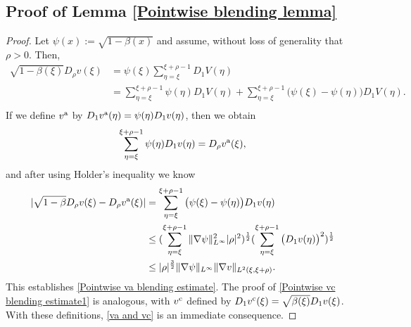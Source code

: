 \subsection{Proof of Lemma \ref{Pointwise blending lemma}}\label{Appendix section 3}
\begin{proof}
	Let $\psi(x):=\sqrt{1-\beta(x)}$ and assume, without loss of generality that $\rho>0$. Then,
	\begin{align*}
		\sqrt{1-\beta(\xi)} D_{\rho}v(\xi)&= \psi (\xi) \sum_{\eta = \xi}^{\xi+\rho-1}D_{1}V(\eta)\\
		&=\sum_{\eta = \xi}^{\xi+\rho-1}\psi(\eta)D_{1}V(\eta) + \sum_{\eta = \xi}^{\xi+\rho-1} \big(\psi(\xi)-\psi(\eta)\big)D_{1}V(\eta).\\
	\end{align*}
	If we define $v^{\text{a}}$ by $D_{1}v^{\text{a}}(\eta)=\psi(\eta)D_{1}v(\eta)$, then we obtain
	\begin{equation*}
		\sum_{\eta = \xi}^{\xi+\rho-1} \psi(\eta) D_{1}v(\eta) =D_{\rho} v^{\text{a}} (\xi),
	\end{equation*}
	and after using Holder's inequality we know
	\begin{align*}
		\vert\sqrt{1-\beta} D_{\rho}v(\xi)-D_{\rho}v^{\text{a}}(\xi)\vert&=\sum_{\eta = \xi}^{\xi+\rho-1}\big(\psi(\xi)-\psi(\eta)\big)D_{1}v(\eta)\\
		&\le (\sum_{\eta = \xi}^{\xi+\rho-1} \Vert \nabla \psi \Vert^{2}_{L^{\infty}} \vert \rho \vert^{2})^{\frac{1}{2}} (\sum_{\eta = \xi}^{\xi+\rho-1}\big(D_{1}v(\eta)\big)^{2})^{\frac{1}{2}}\\
		&\le \vert \rho \vert^{\frac{3}{2}} \Vert \nabla \psi \Vert_{L^{\infty}} \Vert \nabla v \Vert_{L^{2}(\xi,\xi+\rho)}.
	\end{align*}
	This establishes \eqref{Pointwise va blending estimate}. The proof of \eqref{Pointwise vc blending estimate1} is analogous, with $v^{\text{c}}$ defined by $D_{1}v^{\text{c}}(\xi) = \sqrt{\beta(\xi)}D_{1}v(\xi)$. With these definitions, \eqref{va and vc} is an immediate consequence.
\end{proof}
